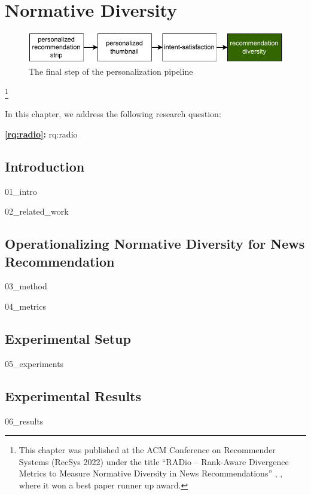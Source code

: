 \chapter{Normative Diversity}
\label{chapter:research-radio}

\begin{figure}[ht]
  \centering
  \includegraphics{images/pipeline_step4.pdf}
  \caption{The final step of the personalization pipeline}
  \label{fig:pip4}
\end{figure}

\footnote[]{This chapter was published at the ACM Conference on Recommender Systems (RecSys 2022) under the title ``RADio – Rank-Aware Divergence Metrics to Measure Normative Diversity in News Recommendations'' \citep{radio}, , where it won a best paper runner up award.}
\acresetall

In this chapter, we address the following research question:

\medskip
\noindent
\textbf{\ref{rq:radio}:} \acl{rq:radio}
\medskip

\noindent



\section{Introduction}
{01_intro}
\label{sec:introduction}

{02_related_work}

\section{Operationalizing Normative Diversity for News Recommendation}
\label{sec:method}
{03_method}

\label{sec:metrics_implementation}
{04_metrics}

\section{Experimental Setup} 
\label{sec:experiments}
{05_experiments}

\section{Experimental Results} 
\label{sec:results}
{06_results}

